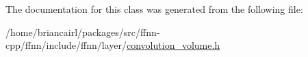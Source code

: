 The documentation for this class was generated from the following file\-:\begin{DoxyCompactItemize}
\item 
/home/briancairl/packages/src/ffnn-\/cpp/ffnn/include/ffnn/layer/\hyperlink{convolution__volume_8h}{convolution\-\_\-volume.\-h}\end{DoxyCompactItemize}
